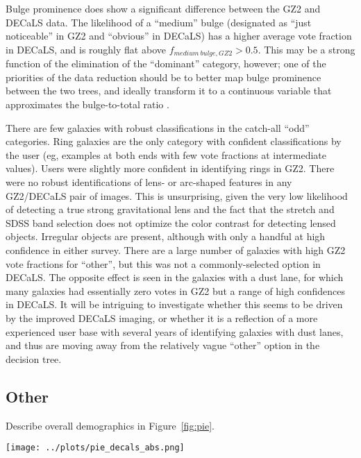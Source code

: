 \documentclass[iop,apj,tighten]{emulateapj}
\begin{document}
Bulge prominence does show a significant difference between the GZ2 and DECaLS data. The likelihood of a ``medium'' bulge (designated as ``just noticeable'' in GZ2 and ``obvious'' in DECaLS) has a higher average vote fraction in DECaLS, and is roughly flat above $f_{medium~bulge,GZ2}>0.5$. This may be a strong function of the elimination of the ``dominant'' category, however; one of the priorities of the data reduction should be to better map bulge prominence between the two trees, and ideally transform it to a continuous variable that approximates the bulge-to-total ratio \citep[eg,][]{lac12}. 

There are few galaxies with robust classifications in the catch-all ``odd'' categories. Ring galaxies are the only category with confident classifications by the user (eg, examples at both ends with few vote fractions at intermediate values). Users were slightly more confident in identifying rings in GZ2. There were no robust identifications of lens- or arc-shaped features in any GZ2/DECaLS pair of images. This is unsurprising, given the very low likelihood of detecting a true strong gravitational lens \citep[$\sim2\times10^{-4}$;][]{mar16} and the fact that the stretch and SDSS band selection does not optimize the color contrast for detecting lensed objects. Irregular objects are present, although with only a handful at high confidence in either survey. There are a large number of galaxies with high GZ2 vote fractions for ``other'', but this was not a commonly-selected option in DECaLS. The opposite effect is seen in the galaxies with a dust lane, for which many galaxies had essentially zero votes in GZ2 but a range of high confidences in DECaLS. It will be intriguing to investigate whether this seems to be driven by the improved DECaLS imaging, or whether it is a reflection of a more experienced user base with several years of identifying galaxies with dust lanes, and thus are moving away from the relatively vague ``other'' option in the decision tree.

\subsection{Other}
Describe overall demographics in Figure~\ref{fig:pie}.

\begin{figure*}
\centering
\texttt{[image: ../plots/pie\_decals\_abs.png]}
\caption{Distribution of the plurality morphological category for each task in GZ:DECaLS. Labels show the count of the number of galaxies with each morphology, including only those for which the question was reached in the hierarchical tree.\label{fig:pie}}
\end{figure*}
\end{document}
